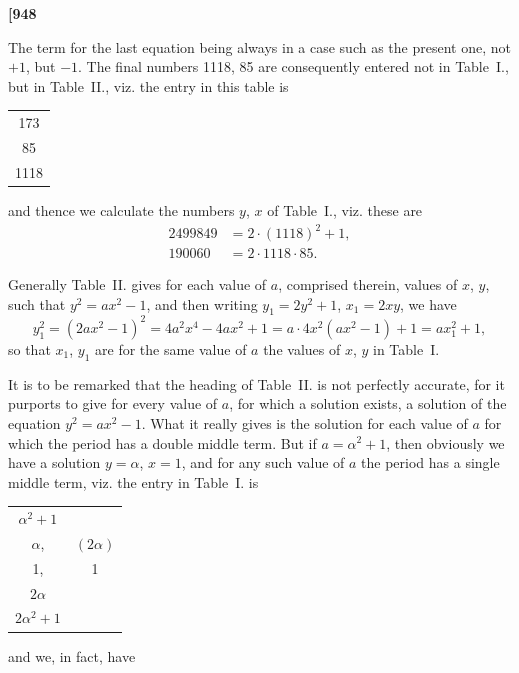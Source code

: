 \documentclass[11pt,a4paper]{book}
\begin{document}
\newpage
\noindent\textbf{[948}

The term for the last equation being always in a case such as the present one, not $+1$, but $-1$. The final numbers 1118, 85 are consequently entered not in Table~I., but in Table~II., viz. the entry in this table is
\begin{center}
\begin{tabular}{c}
173 \\
85 \\
1118
\end{tabular}
\end{center}
and thence we calculate the numbers $y$, $x$ of Table~I., viz. these are
\[
\begin{aligned}
2499849 &= 2 \cdot (1118)^{2} + 1, \\
190060 &= 2 \cdot 1118 \cdot 85.
\end{aligned}
\]

Generally Table~II. gives for each value of $a$, comprised therein, values of $x$, $y$, such that $y^{2} = ax^{2} - 1$, and then writing $y_{1} = 2y^{2} + 1$, $x_{1} = 2xy$, we have
\[
y_{1}^{2} = (2ax^{2} - 1)^{2} = 4a^{2}x^{4} - 4ax^{2} + 1 = a \cdot 4x^{2}(ax^{2} - 1) + 1 = ax_{1}^{2} + 1,
\]
so that $x_{1}$, $y_{1}$ are for the same value of $a$ the values of $x$, $y$ in Table~I.

It is to be remarked that the heading of Table~II. is not perfectly accurate, for it purports to give for every value of $a$, for which a solution exists, a solution of the equation $y^{2} = ax^{2} - 1$. What it really gives is the solution for each value of $a$ for which the period has a double middle term. But if $a = \alpha^{2} + 1$, then obviously we have a solution $y = \alpha$, $x = 1$, and for any such value of $a$ the period has a single middle term, viz. the entry in Table~I. is

\begin{center}
\begin{tabular}{cc}
$\alpha^{2}+1$ & \\
$\alpha$, & $(2\alpha)$ \\
1, & 1 \\
$2\alpha$ & \\
$2\alpha^{2}+1$ &
\end{tabular}
\end{center}

and we, in fact, have
\end{document}
